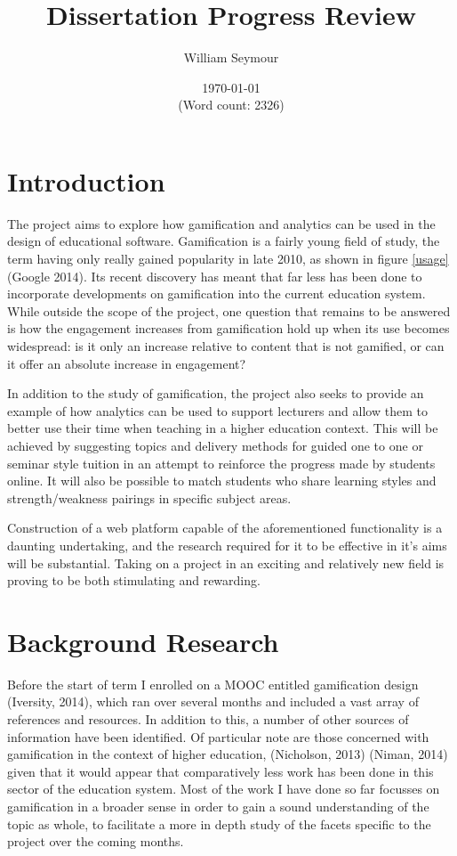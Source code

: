 \documentclass[10pt,a4paper]{report}
\author{William Seymour}
\title{Dissertation Progress Review}
\date{\today \\ (Word count: 2326)}
\begin{document}
\maketitle

\section*{Introduction}
The project aims to explore how gamification and analytics can be used in the design of educational software. Gamification is a fairly young field of study, the term having only really gained popularity in late 2010, as shown in figure \ref{usage} (Google 2014). Its recent discovery has meant that far less has been done to incorporate developments on gamification into the current education system. While outside the scope of the project, one question that remains to be answered is how the engagement increases from gamification hold up when its use becomes widespread: is it only an increase relative to content that is not gamified, or can it offer an absolute increase in engagement?

In addition to the study of gamification, the project also seeks to provide an example of how analytics can be used to support lecturers and allow them to better use their time when teaching in a higher education context. This will be achieved by suggesting topics and delivery methods for guided one to one or seminar style tuition in an attempt to reinforce the progress made by students online. It will also be possible to match students who share learning styles and strength/weakness pairings in specific subject areas.

Construction of a web platform capable of the aforementioned functionality is a daunting undertaking, and the research required for it to be effective in it's aims will be substantial. Taking on a project in an exciting and relatively new field is proving to be both stimulating and rewarding.

\section*{Background Research}
Before the start of term I enrolled on a MOOC entitled gamification design (Iversity, 2014), which ran over several months and included a vast array of references and resources. In addition to this, a number of other sources of information have been identified. Of particular note are those concerned with gamification in the context of higher education, (Nicholson, 2013) (Niman, 2014) given that it would appear that comparatively less work has been done in this sector of the education system. Most of the work I have done so far focusses on gamification in a broader sense in order to gain a sound understanding of the topic as whole, to facilitate a more in depth study of the facets specific to the project over the coming months.
\end{document}

